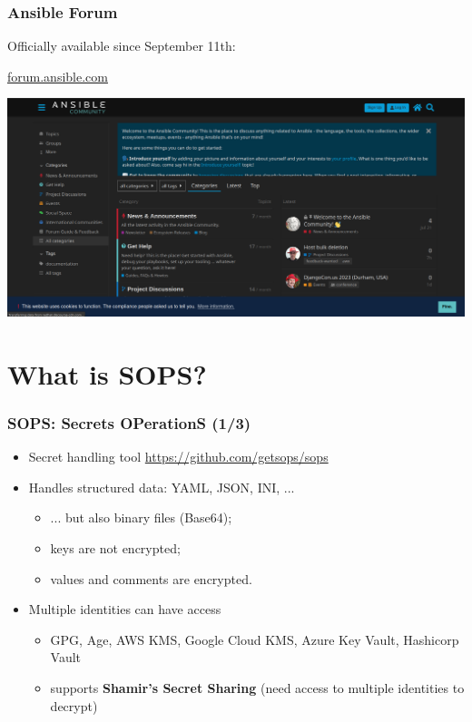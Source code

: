 \documentclass{beamer}
\newlength\beamerleftmargin
\begin{document}
  \begin{frame}
    \frametitle{Ansible Forum}
    \vspace{-0.25cm}
    \begin{center}
      Officially available since September 11th:
      
      \vspace{0.2cm}
      
      \alert{\Huge \href{https://forum.ansible.com}{forum.ansible.com}}
      
      \vspace{0.1cm}
    \end{center}

    \hspace*{-\beamerleftmargin}%
    \href{https://forum.ansible.com}{\includegraphics[width=\paperwidth]{../source/ansible-forum.png}}
  \end{frame}

  \section{What is SOPS?}
  \begin{frame}
    \frametitle{SOPS: Secrets OPerationS (1/3)}
    \begin{itemize}
      \item \alert{Secret handling tool} \url{https://github.com/getsops/sops}
      \item<2-> Handles \alert{structured data:} YAML, JSON, INI, ...
      \begin{itemize}
        \item ... but also binary files (Base64);
        \item keys are not encrypted;
        \item values and comments are encrypted.
      \end{itemize}
      \item<3-> \alert{Multiple identities} can have access
      \begin{itemize}
        \item GPG, Age, AWS KMS, Google Cloud KMS, Azure Key Vault, Hashicorp Vault
        \item supports \textbf{Shamir's Secret Sharing} (need access to multiple identities to decrypt)
      \end{itemize}
    \end{itemize}
  \end{frame}
\end{document}
